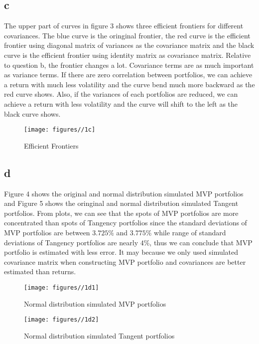 \documentclass{report}
\begin{document}
\subsection{c}
The upper part of curves in figure 3 shows three efficient frontiers for different covariances. The blue curve is the oringinal frontier, the red curve is the efficient frontier using diagonal matrix of variances as the covariance matrix and the black curve is the efficient frontier using identity matrix as covariance matrix. Relative to question b, the frontier changes a lot. Covariance terms are as much important as variance terms. If there are zero correlation between portfolios, we can achieve a return with much less volatility and the curve bend much more backward as the red curve shows. Also, if the variances of each portfolios are reduced, we can achieve a return with less volatility and the curve will shift to the left as the black curve shows.
\begin{figure}[H]
        \centering 
         \texttt{[image: figures//1c]}
         \caption{ Efficient Frontiers}
\end{figure}


\subsection{d}
Figure 4 shows the original and normal distribution simulated MVP portfolios and Figure 5 shows the oringinal and normal distribution simulated Tangent portfolios. From plots, we can see that the spots of MVP portfolios are more concentrated than spots of Tangency portfolios since the standard deviations of MVP portfolios are between $3.725\%$ and $3.775\%$ while range of standard deviations of Tangency portfolios are nearly $4\%$, thus we can conclude that MVP portfolio is estimated with less error. It may because we only used simulated covariance matrix when constructing MVP portfolio and covariances are better estimated than returns.
\begin{figure}[H]
        \centering 
         \texttt{[image: figures//1d1]}
         \caption{ Normal distribution simulated MVP portfolios}
\end{figure}
\begin{figure}[H]
        \centering 
         \texttt{[image: figures//1d2]}
         \caption{ Normal distribution simulated Tangent portfolios}
\end{figure}
\end{document}
